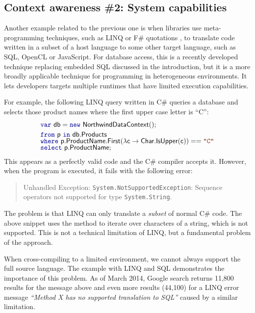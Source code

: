 
\subsection{Context awareness \#2: System capabilities}

Another example related to the previous one is when libraries use meta-programming techniques,
such as LINQ \cite{app-linq,app-linq-essence} or F\# quotations \cite{app-fsharp-metaprog}, to 
translate code written in a subset of a host language to some other target language, such as SQL, 
OpenCL or JavaScript. For database access, this is a recently developed technique replacing embedded 
SQL discussed in the introduction, but it is a more broadly applicable technique for programming
in heterogeneous environments. It lets developers targets multiple runtimes that have limited 
execution capabilities.

For example, the following LINQ query written in C\# queries a database and
selects those product names where the first upper case letter is ``C'':
%
\begin{equation*}
\begin{array}{l}
\kvd{var}~\ident{db} = \kvd{new}~\ident{NorthwindDataContext}();\\[0.25em]
\kvd{from}~\ident{p}~\kvd{in}~\ident{db.Products}\\[-0.25em]
\kvd{where}~\ident{p.ProductName.First}(\lambda \ident{c} \rightarrow \ident{Char.IsUpper}(\ident{c})) == \str{C}\\[-0.25em]
\kvd{select}~\ident{p.ProductName};
\end{array}
\end{equation*}
%
This appears as a perfectly valid code and the C\# compiler accepts it. However, when the program
is executed, it fails with the following error:
%
\begin{quote}
Unhandled Exception: \texttt{System.NotSupportedException}: Sequence operators
not supported for type \texttt{System.String}.
\end{quote}
%
The problem is that LINQ can only translate a \emph{subset} of normal C\# code. The above snippet
uses the  method to iterate over characters of a string, which is not supported. This is
not a technical limitation of LINQ, but a fundamental problem of the approach.

When cross-compiling to a limited environment, we cannot always support the full source language.
The example with LINQ and SQL demonstrates the importance of this problem. As of March 2014,
Google search returns 11,800 results for the message above and even more results (44,100) for a
LINQ error message \emph{``Method X has no supported translation to SQL''} caused by a similar
limitation.

